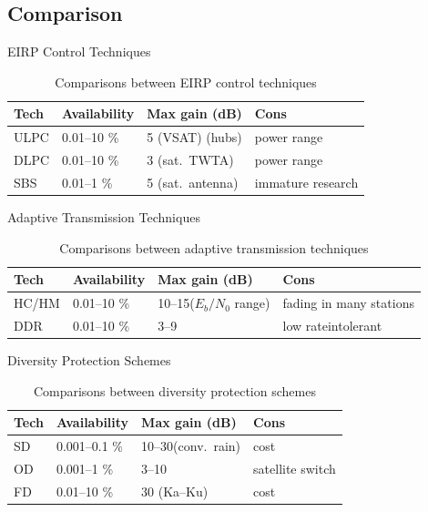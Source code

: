 \documentclass[pdf]{beamer}
\begin{document}
\subsection{Comparison}
\begin{frame}{EIRP Control Techniques}
  \begin{table}
    \begin{tabular}{l l p{} p{}}
      \toprule
      \textbf{Tech} & \textbf{Availability}
      & \textbf{Max gain} (dB) & \textbf{Cons} \\
      \midrule
      ULPC & 0.01--10 \% & 5 (VSAT)\newline 15 (hubs)& power range \\
      DLPC & 0.01--10 \% & 3 (sat.~TWTA) & power range \\
      SBS & 0.01--1 \% & 5 (sat.~antenna) & immature research \\
      \bottomrule
    \end{tabular}
    \caption{Comparisons between EIRP control techniques}
  \end{table}
\end{frame}

\begin{frame}{Adaptive Transmission Techniques}
  \begin{table}
    \begin{tabular}{l l p{} p{}}
      \toprule
      \textbf{Tech} & \textbf{Availability}
      & \textbf{Max gain} (dB) & \textbf{Cons} \\
      \midrule
      HC/HM & 0.01--10 \% & 10--15\newline ($E_b/N_0$ range)
      & fading in \newline many stations \\
      DDR & 0.01--10 \% & 3--9 & low rate\newline intolerant \\
      \bottomrule
    \end{tabular}
    \caption{Comparisons between adaptive transmission techniques}
  \end{table}
\end{frame}

\begin{frame}{Diversity Protection Schemes}
  \begin{table}
    \begin{tabular}{l l p{} p{}}
      \toprule
      \textbf{Tech} & \textbf{Availability}
      & \textbf{Max gain} (dB) & \textbf{Cons} \\
      \midrule
      SD & 0.001--0.1 \% & 10--30\newline (conv.~rain) & cost \\
      OD & 0.001--1 \%  & 3--10 & satellite switch \\
      FD & 0.01--10 \% & 30 (Ka--Ku) & cost\\
      \bottomrule
    \end{tabular}
    \caption{Comparisons between diversity protection schemes}
  \end{table}
\end{frame}
\end{document}
